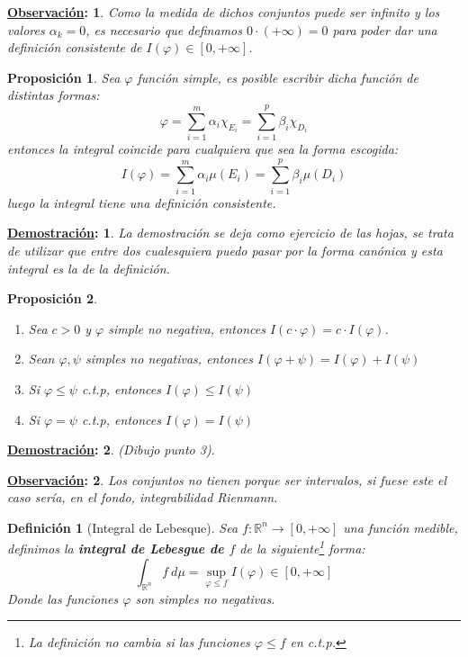 \documentclass[10pt,a4paper,openright]{book}
\theoremstyle{break}
\newtheorem*{defi}{Definición}
\newtheorem*{prop}{Proposición}
\newtheorem*{demo}{\underline{Demostración}:}
\newtheorem*{obs}{\underline{Observación}:}
\begin{document}
\begin{obs}
Como la medida de dichos conjuntos puede ser infinito y los valores $\alpha_k = 0$, es necesario que definamos $0 \cdot \left(+ \infty\right) = 0$ para poder dar una definición consistente de $I\left(\varphi\right) \in \left[0, +\infty\right]$.
\end{obs}

\begin{prop}
Sea $\varphi$ función simple, es posible escribir dicha función de distintas formas:
$$\varphi = \sum_{i=1}^{m} \alpha_i \chi_{E_i} = \sum_{i=1}^{p} \beta_i \chi_{D_i}$$
entonces la integral coincide para cualquiera que sea la forma escogida:
$$I(\varphi) = \sum_{i=1}^{m} \alpha_i \mu\left(E_i\right) = \sum_{i=1}^{p} \beta_i \mu\left(D_i\right)$$
luego la integral tiene una definición consistente.
\end{prop}
\begin{demo}
La demostración se deja como ejercicio de las hojas, se trata de utilizar que entre dos cualesquiera puedo pasar por la forma canónica y esta integral es la de la definición.
\end{demo}

\begin{prop}
\begin{enumerate}
    \item Sea $c > 0$ y $\varphi$ simple no negativa, entonces $I\left(c\cdot \varphi\right) = c\cdot I\left(\varphi\right)$.
    \item Sean $\varphi, \psi$ simples no negativas, entonces $I\left(\varphi + \psi\right) = I\left(\varphi\right) + I\left(\psi\right)$
    \item Si $\varphi \le \psi$ c.t.p, entonces $I\left(\varphi\right) \le I\left(\psi\right)$
    \item Si $\varphi = \psi$ c.t.p, entonces $I\left(\varphi\right) = I\left(\psi\right)$
\end{enumerate}
\end{prop}
\begin{demo}
(\textit{Dibujo punto 3}). 
\end{demo}

\begin{obs}
Los conjuntos no tienen porque ser intervalos, si fuese este el caso sería, en el fondo, integrabilidad Rienmann.
\end{obs}

\begin{defi}[Integral de Lebesque]
Sea $f: \mathbb{R}^n \rightarrow \left[0, +\infty\right]$ una función medible, definimos la \textbf{integral de Lebesgue de $f$} de la siguiente\footnote{La definición no cambia si las funciones $\varphi \leq f$ en c.t.p.} forma:
$$\int_{\mathbb{R}^n}f \ d\mu = \sup_{\varphi \leq f} I\left(\varphi\right) \in \left[0, +\infty\right]$$
Donde las funciones $\varphi$ son simples no negativas.
\end{defi}
\end{document}
